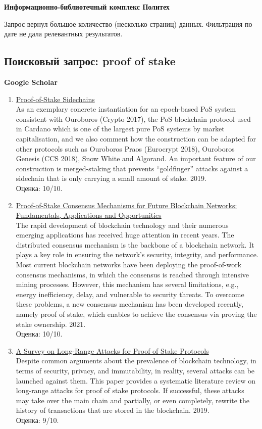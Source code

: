 \documentclass[a4paper, 12pt]{report}		%
\begin{document}
\textbf{Информационно-библиотечный комплекс Политех}

Запрос вернул большое количество (несколько страниц) данных. Фильтрация по дате не дала релевантных результатов.

\subsection*{Поисковый запрос: proof of stake}

\textbf{Google Scholar}

\begin{enumerate}
\item \href{https://ieeexplore.ieee.org/abstract/document/8835275}{Proof-of-Stake Sidechains}\\
As an exemplary concrete instantiation for an epoch-based PoS system consistent with Ouroboros (Crypto 2017), the PoS blockchain protocol used in Cardano which is one of the largest pure PoS systems by market capitalisation, and we also comment how the construction can be adapted for other protocols such as Ouroboros Praos (Eurocrypt 2018), Ouroboros Genesis (CCS 2018), Snow White and Algorand. An important feature of our construction is merged-staking that prevents “goldfinger” attacks against a sidechain that is only carrying a small amount of stake. 2019.\\
Оценка: 10/10.
\item \href{https://ieeexplore.ieee.org/abstract/document/8746079}{Proof-of-Stake Consensus Mechanisms for Future Blockchain Networks: Fundamentals, Applications and Opportunities}\\
The rapid development of blockchain technology and their numerous emerging applications has received huge attention in recent years. The distributed consensus mechanism is the backbone of a blockchain network. It plays a key role in ensuring the network's security, integrity, and performance. Most current blockchain networks have been deploying the proof-of-work consensus mechanisms, in which the consensus is reached through intensive mining processes. However, this mechanism has several limitations, e.g., energy inefficiency, delay, and vulnerable to security threats. To overcome these problems, a new consensus mechanism has been developed recently, namely proof of stake, which enables to achieve the consensus via proving the stake ownership. 2021.\\
Оценка: 10/10.
\item \href{https://ieeexplore.ieee.org/abstract/document/8653269}{A Survey on Long-Range Attacks for Proof of Stake Protocols}\\
Despite common arguments about the prevalence of blockchain technology, in terms of security, privacy, and immutability, in reality, several attacks can be launched against them. This paper provides a systematic literature review on long-range attacks for proof of stake protocols. If successful, these attacks may take over the main chain and partially, or even completely, rewrite the history of transactions that are stored in the blockchain. 2019.\\
Оценка: 9/10.
\end{enumerate}
\end{document}
